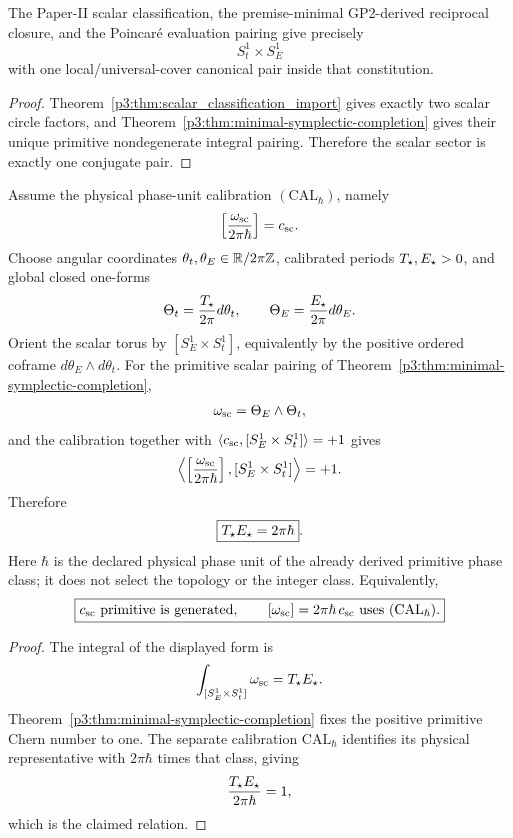\documentclass[12pt,a4paper]{article}
\begin{document}
\begin{corollary}
\label{p3:cor:missing-sector-one-pair}
The Paper-II scalar classification, the premise-minimal GP2-derived reciprocal
closure, and the Poincar\'e
evaluation pairing give precisely
\[
        S^1_t\times S^1_E
\]
with one local/universal-cover canonical pair inside that constitution.
\end{corollary}

\begin{proof}
Theorem~\ref{p3:thm:scalar_classification_import} gives exactly two scalar
circle factors, and Theorem~\ref{p3:thm:minimal-symplectic-completion} gives
their unique primitive nondegenerate integral pairing.  Therefore the scalar
sector is exactly one conjugate pair.
\end{proof}

\begin{lemma}
\label{p3:lem:minimal-phase-torus-quantization}
Assume the physical phase-unit calibration \((\mathrm{CAL}_{\hbar})\), namely
\[
   \left[\frac{\omega_{\rm sc}}{2\pi\hbar}\right]=c_{\rm sc}.
\]
Choose angular coordinates
\(\theta_t,\theta_E\in\mathbb{R}/2\pi\mathbb{Z}\), calibrated periods
\(T_\star,E_\star>0\), and global closed one-forms
\[
        \Theta_t=\frac{T_\star}{2\pi}d\theta_t,
        \qquad
        \Theta_E=\frac{E_\star}{2\pi}d\theta_E.
\]
Orient the scalar torus by
\([S^1_E\times S^1_t]\), equivalently by the positive ordered coframe
\(d\theta_E\wedge d\theta_t\).
For the primitive scalar pairing of
Theorem~\ref{p3:thm:minimal-symplectic-completion},
\[
        \omega_{\rm sc}=\Theta_E\wedge\Theta_t,
\]
and the calibration together with
\(\langle c_{\rm sc},[S^1_E\times S^1_t]\rangle=+1\) gives
\[
 \left\langle
 \left[\frac{\omega_{\rm sc}}{2\pi\hbar}\right],
 [S^1_E\times S^1_t]
 \right\rangle=+1.
\]
Therefore
\[
        \boxed{T_\star E_\star=2\pi\hbar}.
\]
Here \(\hbar\) is the declared physical phase unit of the already derived primitive
phase class; it does not select the topology or the integer class.  Equivalently,
\[
 \boxed{
 c_{\rm sc}\text{ primitive is generated},
 \qquad
 [\omega_{\rm sc}]=2\pi\hbar\,c_{\rm sc}
 \text{ uses }(\mathrm{CAL}_{\hbar}).}
\]
\end{lemma}

\begin{proof}
The integral of the displayed form is
\[
        \int_{[S^1_E\times S^1_t]}\omega_{\rm sc}=T_\star E_\star.
\]
Theorem~\ref{p3:thm:minimal-symplectic-completion} fixes the positive primitive
Chern number to one.  The separate calibration \(\mathrm{CAL}_{\hbar}\) identifies its physical representative with \(2\pi\hbar\) times that class, giving
\[
        \frac{T_\star E_\star}{2\pi\hbar}=1,
\]
which is the claimed relation.
\end{proof}
\end{document}
